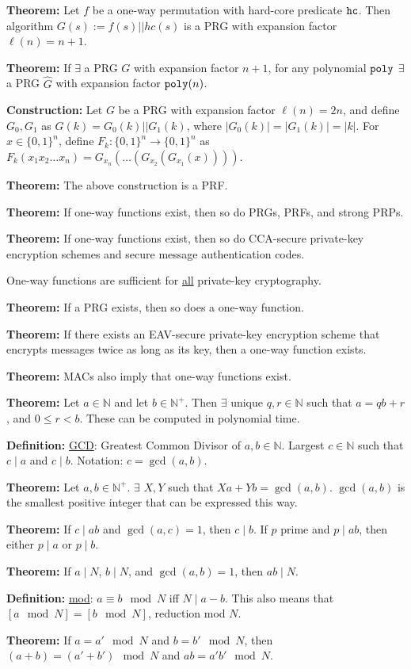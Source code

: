 \documentclass[10pt]{article}
\newcommand{\N}{\mathbb{N}}
\newcommand{\defn}[1]{{\bf Definition:} \underline{#1}}
\newcommand{\thm}[1]{{\bf Theorem:} \underline{#1}}
\newcommand{\con}[1]{{\bf Construction:} \underline{#1}}
\newcommand{\poly}{{\tt poly}}
\newcommand{\hc}{{\tt hc}}
\begin{document}
\begin{multicols}{5}
\thm{}Let $f$ be a one-way permutation with hard-core predicate $\hc$. Then algorithm $G(s):=f(s)||hc(s)$ is a PRG with expansion factor $\ell(n)=n+1$.

\thm{}If $\exists$ a PRG $G$ with expansion factor $n+1$, for any polynomial $\poly$ $\exists$ a PRG $\hat{G}$ with expansion factor $\poly(n)$.

\con{}Let $G$ be a PRG with expansion factor $\ell(n)=2n$, and define $G_0,G_1$ as $G(k)=G_0(k)||G_1(k)$, where $|G_0(k)|=|G_1(k)|=|k|$. For $x\in\{0,1\}^n$, define $F_k:\{0,1\}^n\to\{0,1\}^n$ as $F_k(x_1x_2\dots x_n)=G_{x_n}(\dots(G_{x_2}(G_{x_1}(x))))$.

\thm{}The above construction is a PRF.

\thm{}If one-way functions exist, then so do PRGs, PRFs, and strong PRPs.

\thm{}If one-way functions exist, then so do CCA-secure private-key encryption schemes and secure message authentication codes.

One-way functions are sufficient for \underline{all} private-key cryptography.

\thm{}If a PRG exists, then so does a one-way function.

\thm{}If there exists an EAV-secure private-key encryption scheme that encrypts messages twice as long as its key, then a one-way function exists.

\thm{}MACs also imply that one-way functions exist.

\thm{}Let $a\in\N$ and let $b\in\N^+$. Then $\exists$ unique $q,r\in\N$ such that $a=qb+r$, and $0\leq r<b$. These can be computed in polynomial time.

\defn{GCD}: Greatest Common Divisor of $a,b\in\N$. Largest $c\in\N$ such that $c\mid a$ and $c\mid b$. Notation: $c=\gcd(a,b)$.

\thm{}Let $a,b\in\N^+$. $\exists$ $X,Y$ such that $Xa+Yb=\gcd(a,b)$. $\gcd(a,b)$ is the smallest positive integer that can be expressed this way.

\thm{}If $c\mid ab$ and $\gcd(a,c)=1$, then $c\mid b$. If $p$ prime and $p\mid ab$, then either $p\mid a$ or $p\mid b$.

\thm{}If $a\mid N$, $b\mid N$, and $\gcd(a,b)=1$, then $ab\mid N$.

\defn{mod}: $a\equiv b\mod{N}$ iff $N\mid{a-b}$. This also means that $[a\mod{N}]=[b\mod{N}]$, reduction mod $N$.

\thm{}If $a=a'\mod{N}$ and $b=b'\mod{N}$, then $(a+b)=(a'+b')\mod{N}$ and $ab=a'b'\mod{N}$.


\end{multicols}
\end{document}
